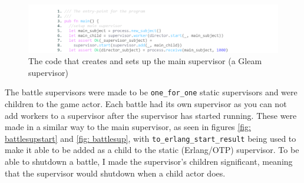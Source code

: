 \documentclass[]{final}
\begin{document}
\begin{figure}[H]
  \centering
  \includegraphics[width=\textwidth]{main_supervisor.pdf}
  \caption{The code that creates and sets up the main supervisor (a Gleam supervisor)}\label{fig: mainsup}
\end{figure}

\newpage

The battle supervisors were made to be \lstinline|one_for_one| static
supervisors and were children to the game actor. Each battle had its own
supervisor as you can not add workers to a supervisor after the supervisor
has started running. These were made in a similar way to the main supervisor,
as seen in figures \ref{fig: battlesupstart} and \ref{fig: battlesup}, with
\lstinline|to_erlang_start_result| being used to make it able to be added as
a child to the static (Erlang/OTP) supervisor.
To be able to shutdown a battle, I made the supervisor's children
significant, meaning that the supervisor would shutdown when a child actor does.
\end{document}
